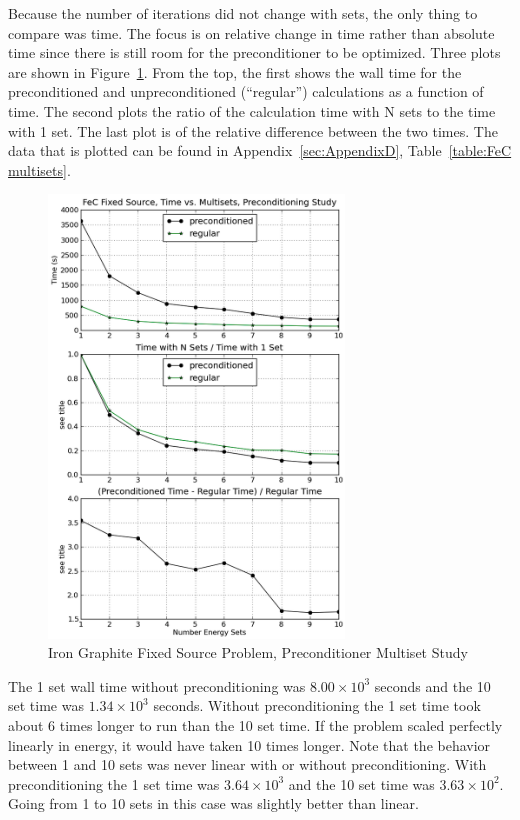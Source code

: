 Because the number of iterations did not change with sets, the only thing to compare was time. The focus is on relative change in time rather than absolute time since there is still room for the preconditioner to be optimized. Three plots are shown in Figure~\ref{fig:FeC multisets}. From the top, the first shows the wall time for the preconditioned and unpreconditioned (``regular'') calculations as a function of time. The second plots the ratio of the calculation time with N sets to the time with 1 set. The last plot is of the relative difference between the two times. The data that is plotted can be found in Appendix~\ref{sec:AppendixD}, Table~\ref{table:FeC multisets}.
%
\begin{figure}[!ht]
    \begin{center}
      \includegraphics [width=0.7\textwidth, height=0.8\textheight] {FeCmultisets}
   \end{center}
   \caption{Iron Graphite Fixed Source Problem, Preconditioner Multiset Study}
   \label{fig:FeC multisets}
\end{figure}

The 1 set wall time without preconditioning was $8.00 \times 10^{3}$ seconds and the 10 set time was $1.34 \times 10^{3}$ seconds. Without preconditioning the 1 set time took about 6 times longer to run than the 10 set time. If the problem scaled perfectly linearly in energy, it would have taken 10 times longer. Note that the behavior between 1 and 10 sets was never linear with or without preconditioning. With preconditioning the 1 set time was $3.64 \times 10^{3}$ and the 10 set time was $3.63 \times 10^{2}$. Going from 1 to 10 sets in this case was slightly better than linear. 


